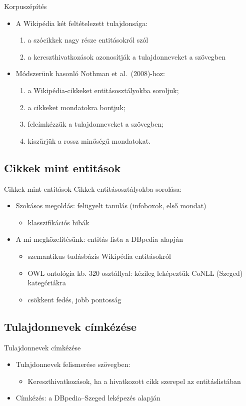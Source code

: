 \documentclass[utf8x,t]{beamer}
\newcommand{\vitem}{\item \vspace{4pt}}
\begin{document}
\begin{frame}{Korpuszépítés}
  \bigskip
  \begin{itemize}
  \vitem A Wikipédia két feltételezett tulajdonsága:
    \begin{enumerate}
    \vitem a szócikkek nagy része entitásokról szól
    \vitem a kereszthivatkozások azonosítják a tulajdonneveket a szövegben
    \end{enumerate}
  \vitem Módszerünk hasonló Nothman et al.~(2008)-hoz:
    \begin{enumerate}
    \vitem a Wikipédia-cikkeket entitásosztályokba soroljuk;
    \vitem a cikkeket mondatokra bontjuk;
    \vitem felcímkézzük a tulajdonneveket a szövegben;
    \vitem kiszűrjük a rossz minőségű mondatokat.
    \end{enumerate}
  \end{itemize}
\end{frame}

\subsection{Cikkek mint entitások}
\begin{frame}{Cikkek mint entitások}
  \bigskip
  Cikkek entitásosztályokba sorolása:
  \smallskip
  \begin{itemize}
  \vitem Szokásos megoldás: felügyelt tanulás (infoboxok, első mondat)
    \begin{itemize}
    \vitem klasszifikációs hibák
    \end{itemize}
  \vitem A mi megközelítésünk: entitás lista a DBpedia alapján
    \begin{itemize}
    \vitem szemantikus tudásbázis Wikipédia entitásokról
    \vitem OWL ontológia kb. 320 osztállyal: kézileg leképeztük CoNLL (Szeged) kategóriákra
    \vitem csökkent fedés, jobb pontosság
    \end{itemize}
  \end{itemize}
\end{frame}

\subsection{Tulajdonnevek címkézése}
\begin{frame}{Tulajdonnevek címkézése}
  \bigskip
  \begin{itemize}
  \vitem Tulajdonnevek felismerése szövegben:
    \begin{itemize}
    \vitem Kereszthivatkozások, ha a hivatkozott cikk szerepel az entitáslistában
    \end{itemize}
  \vitem Címkézés: a DBpedia--Szeged leképezés alapján
  \end{itemize}
\end{frame}
\end{document}
